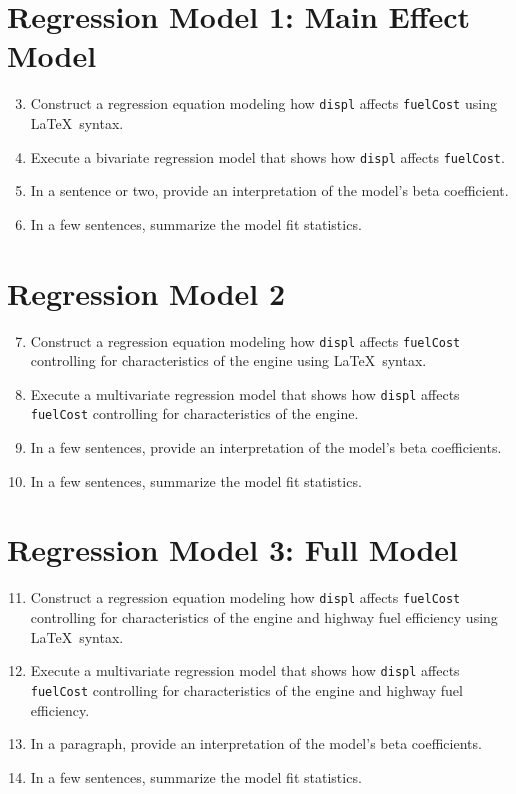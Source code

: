 \documentclass{tufte-handout}
\begin{document}
\section{Regression Model 1: Main Effect Model}
\begin{enumerate}
\setcounter{enumi}{2}
\item Construct a regression equation modeling how \texttt{displ} affects \texttt{fuelCost} using \LaTeX{}\ syntax.
\item Execute a bivariate regression model that shows how \texttt{displ} affects \texttt{fuelCost}.
\item In a sentence or two, provide an interpretation of the model's beta coefficient.
\item In a few sentences, summarize the model fit statistics.
\end{enumerate}

\vspace{3mm}
\section{Regression Model 2}
\begin{enumerate}
\setcounter{enumi}{6}
\item Construct a regression equation modeling how \texttt{displ} affects \texttt{fuelCost} controlling for characteristics of the engine using \LaTeX{}\ syntax.
\item Execute a multivariate regression model that shows how \texttt{displ} affects \texttt{fuelCost} controlling for characteristics of the engine.
\item In a few sentences, provide an interpretation of the model's beta coefficients.
\item In a few sentences, summarize the model fit statistics.
\end{enumerate}

\vspace{3mm}
\section{Regression Model 3: Full Model}
\begin{enumerate}
\setcounter{enumi}{10}
\item Construct a regression equation modeling how \texttt{displ} affects \texttt{fuelCost} controlling for characteristics of the engine and highway fuel efficiency using \LaTeX{}\ syntax.
\item Execute a multivariate regression model that shows how \texttt{displ} affects \texttt{fuelCost} controlling for characteristics of the engine and highway fuel efficiency.
\item In a paragraph, provide an interpretation of the model's beta coefficients.
\item In a few sentences, summarize the model fit statistics.
\end{enumerate}
\end{document}
